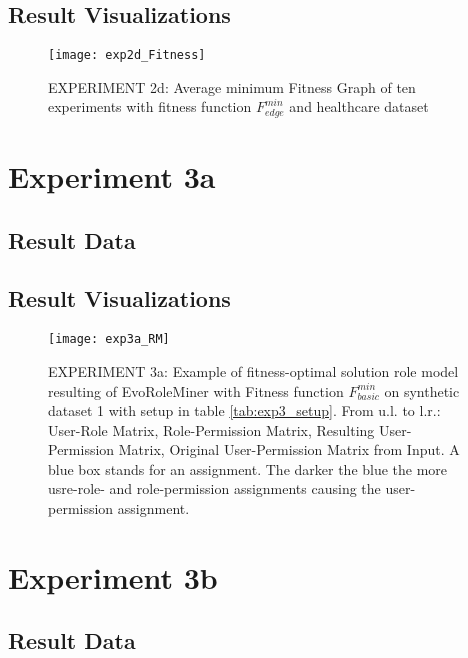 	\subsection{Result Visualizations}
	\label{sec:A_Exp2d_Diagrams}
		\begin{figure}[H]
			\centering
			\texttt{[image: exp2d\_Fitness]}
			\caption{EXPERIMENT 2d: Average minimum Fitness Graph of ten experiments with fitness function $F_{edge}^{min}$ and healthcare dataset}
			\label{fig:exp2d_Fitness}
		\end{figure}

\section{Experiment 3a}
\label{sec:A_Exp3a}
	\subsection{Result Data}
	\label{sec:A_Exp3a_Data}
	\subsection{Result Visualizations}
	\label{sec:A_Exp3a_Diagrams}
		\begin{figure}[H]
			\centering
			\texttt{[image: exp3a\_RM]}
			\caption{EXPERIMENT 3a: Example of fitness-optimal solution role model resulting of EvoRoleMiner with Fitness function $F_{basic}^{min}$ on synthetic dataset 1 with setup in table \ref{tab:exp3_setup}. From u.l. to l.r.: User-Role Matrix, Role-Permission Matrix, Resulting User-Permission Matrix, Original User-Permission Matrix from Input. A blue box stands for an assignment. The darker the blue the more usre-role- and role-permission assignments causing the user-permission assignment.}
			\label{fig:exp3a_RM}
		\end{figure}

\section{Experiment 3b}
\label{sec:A_Exp3b}
	\subsection{Result Data}
	\label{sec:A_Exp3b_Data}
